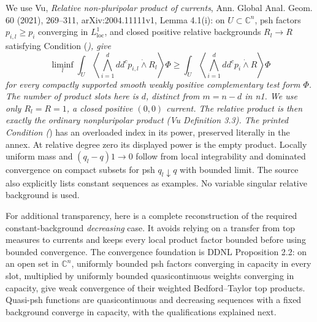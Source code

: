 \documentclass[
  11pt,
]{article}
\begin{document}
We use Vu, \emph{Relative non-pluripolar product of currents}, Ann.
Global Anal. Geom. 60 (2021), 269--311, arXiv:2004.11111v1, Lemma
4.1(i): on \(U\subset\mathbb C^n\), psh factors \(p_{i,l}\geq p_i\)
converging in \(L^1_{\mathrm{loc}}\), and closed positive relative
backgrounds \(R_l\to R\) satisfying Condition (\emph{), give \[
\liminf_l\int_U\left\langle\bigwedge_{i=1}^d dd^cp_{i,l}\mathbin{\dot\wedge}R_l\right\rangle\Phi
\geq\int_U\left\langle\bigwedge_{i=1}^d dd^cp_i\mathbin{\dot\wedge}R\right\rangle\Phi
\] for every compactly supported smooth weakly positive complementary
test form \(\Phi\). The number of product slots here is \(d\), distinct
from \(m=n-d\) in n1. We use only \(R_l=R=1\), a closed positive
\((0,0)\) current. The relative product is then exactly the ordinary
nonpluripolar product (Vu Definition 3.3). The printed Condition (}) has
an overloaded index in its power, preserved literally in the annex. At
relative degree zero its displayed power is the empty product. Locally
uniform mass and \((q_l-q)1\to0\) follow from local integrability and
dominated convergence on compact subsets for psh \(q_l\downarrow q\)
with bounded limit. The source also explicitly lists constant sequences
as examples. No variable singular relative background is used.

For additional transparency, here is a complete reconstruction of the
required constant-background \emph{decreasing} case. It avoids relying
on a transfer from top measures to currents and keeps every local
product factor bounded before using bounded convergence. The convergence
foundation is DDNL Proposition 2.2: on an open set in \(\mathbb C^n\),
uniformly bounded psh factors converging in capacity in every slot,
multiplied by uniformly bounded quasicontinuous weights converging in
capacity, give weak convergence of their weighted Bedford--Taylor top
products. Quasi-psh functions are quasicontinuous and decreasing
sequences with a fixed background converge in capacity, with the
qualifications explained next.
\end{document}
